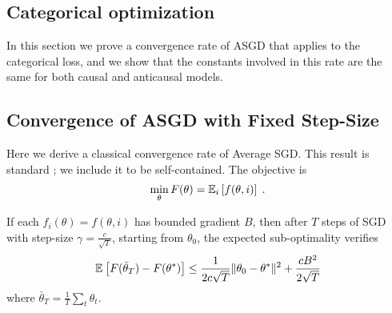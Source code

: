 \begin{subappendices}

\newcommand{\tet}{\theta_t}
\newcommand{\ttt}{\theta_{t+1}}
\newcommand{\ts}{\theta^{*}}

\onecolumn

\section{{Categorical optimization}}

In this section we prove a convergence rate of ASGD that applies to the categorical loss, and we show that the constants involved in this rate are the same for both causal and anticausal models.

\subsection{Convergence of ASGD with Fixed Step-Size}
\label{apdx:asgd_rate}
Here we derive a classical convergence rate of Average SGD.
This result is standard ; we include it to be self-contained.
The objective is 
\begin{align}
\min_{\theta} F(\theta) = \expect[i]{f(\theta,i)} \; .
\end{align}

\begin{theorem}
If each $f_i(\theta) = f(\theta,i)$ has bounded gradient $B$,
then after $T$ steps of SGD with step-size $\gamma=\frac{c}{\sqrt{T}}$,
starting from $\theta_0$,
the expected sub-optimality verifies
\begin{align}
   \expect{F(\bar{\theta}_T) - F(\ts)} \leq \frac{1}{2c\sqrt{T}}\|\theta_0- \ts\|^2 + \frac{ c B^2}{2\sqrt{T}}
\end{align}
where $\bar{\theta}_T = \frac{1}{T} \sum_t \tet$.
\end{theorem}


\end{subappendices}
